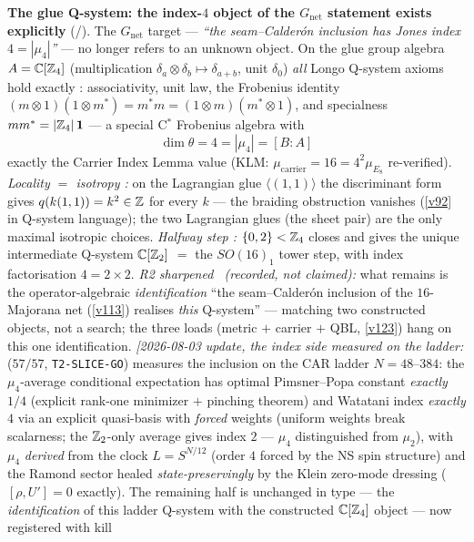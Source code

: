 \par\smallskip\noindent\textbf{The glue Q-system: the index-$4$ object of the $G_{\mathrm{net}}$ statement exists explicitly} (\mE/\mC).
The $G_{\mathrm{net}}$ target --- \emph{``the seam--Calder\'on inclusion has Jones index $4=|\mu_4|$''}
--- no longer refers to an unknown object. On the glue group algebra $A=\mathbb C[\mathbb Z_4]$ (multiplication
$\delta_a\otimes\delta_b\mapsto\delta_{a+b}$, unit $\delta_0$) \emph{all} Longo Q-system axioms hold
exactly \mE: associativity, unit law, the Frobenius identity
$(m\otimes1)(1\otimes m^*)=m^*m=(1\otimes m)(m^*\otimes1)$, and specialness $mm^*=|\mathbb Z_4|\,\mathbf1$ ---
a special C$^*$ Frobenius algebra with
\[
  \boxed{\ \dim\theta=4=|\mu_4|=[B:A]\ }
\]
exactly the Carrier Index Lemma value (KLM: $\mu_{\mathrm{carrier}}=16=4^2\mu_{E_8}$ re-verified).
\emph{Locality $=$ isotropy \mE:} on the Lagrangian glue $\langle(1,1)\rangle$ the discriminant form
gives $q(k(1,1))=k^2\in\mathbb Z$ for every $k$ --- the braiding obstruction vanishes (\vref{v92} in Q-system
language); the two Lagrangian glues (the sheet pair) are the only maximal isotropic choices.
\emph{Halfway step \mE:} $\{0,2\}<\mathbb Z_4$ closes and gives the unique intermediate Q-system
$\mathbb C[\mathbb Z_2]$ $=$ the $SO(16)_1$ tower step, with index factorisation $4=2\times2$. \emph{R2 sharpened
\mC\ (recorded, not claimed):} what remains is the operator-algebraic \emph{identification} ``the
seam--Calder\'on inclusion of the $16$-Majorana net (\vref{v113}) realises \emph{this} Q-system'' --- matching
two constructed objects, not a search; the three loads (metric $+$ carrier $+$ QBL, \vref{v123}) hang on this
one identification.
\emph{[2026-08-03 update, the index side measured on the ladder:}
 ($57/57$,
\texttt{T2-SLICE-GO}) measures the inclusion on the CAR ladder
$N=48$--$384$: the $\mu_4$-average conditional expectation has
optimal Pimsner--Popa constant \emph{exactly} $1/4$ (explicit
rank-one minimizer $+$ pinching theorem) and Watatani index
\emph{exactly} $4$ via an explicit quasi-basis with \emph{forced}
weights (uniform weights break scalarness; the $\mathbb Z_2$-only average
gives index $2$ --- $\mu_4$ distinguished from $\mu_2$), with
$\mu_4$ \emph{derived} from the clock $L=S^{N/12}$ (order $4$
forced by the NS spin structure) and the Ramond sector healed
\emph{state-preservingly} by the Klein zero-mode dressing
($[\rho,U']=0$ exactly).  The remaining half is unchanged in type
--- the \emph{identification} of this ladder Q-system with the
constructed $\mathbb C[\mathbb Z_4]$ object --- now registered with kill
